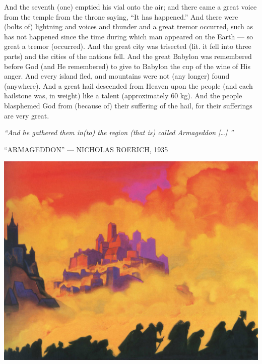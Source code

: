 \begin{pages}
\begin{Leftside}
		\pend
		\pstart
		And the seventh (one) emptied his vial onto the air; and there came a great voice from the temple from the throne saying, “It has happened.” And there were (bolts of) lightning and voices and thunder and a great tremor occurred, such as has not happened since the time during which man appeared on the Earth — so great a tremor (occurred). 
		\pend
		\pstart
		And the great city was trisected (lit. it fell into three parts) and the cities of the nations fell. And the great Babylon was remembered before God (and He remembered) to give to Babylon the cup of the wine of His anger. And every island fled, and mountains were not (any longer) found (anywhere). 
		\pend
		\pstart
		And a great hail descended from Heaven upon the people (and each hailstone was, in weight) like a talent (approximately 60 kg). And the people blasphemed God from (because of) their suffering of the hail, for their sufferings are very great. 
		\pend
        \endnumbering
    \end{Leftside}

\end{pages} 
\Pages

\clearpage
\thispagestyle{empty}
\null\vfill
\settowidth{}
\begin{center}
\parbox{\longest}{%
  \raggedright{\huge\itshape%
    ``And he gathered them in(to) the region (that is) called Armageddon […] '' \par\bigskip
  }
  \raggedleft\Large\MakeUppercase{``Armageddon'' — Nicholas Roerich, 1935}\par%
}
\vfill\vfill
\clearpage\newpage
\end{center}
\newpage
\thispagestyle{empty}
\begin{center}
	\includegraphics[angle=90, width=1\textwidth]{images/illustrations/roericharmageddon}
\end{center}